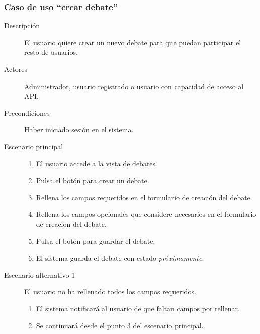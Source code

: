 \subsubsection{Caso de uso ``crear debate''}
\begin{description}
\item[Descripción] El usuario quiere crear un nuevo debate para que puedan participar el resto de usuarios.
\item[Actores] Administrador, usuario registrado o usuario con capacidad de acceso al API.
\item[Precondiciones] Haber iniciado sesión en el sistema.
\item[Escenario principal] \hfill
						 	\begin{enumerate}
							\item El usuario accede a la vista de debates.
							\item Pulsa el botón para crear un debate.
							\item Rellena los campos requeridos en el formulario de creación del debate.
							\item Rellena los campos opcionales que considere necesarios en el formulario de creación del debate.
							\item Pulsa el botón para guardar el debate.
							\item El sistema guarda el debate con estado \textit{próximamente}.
							\end{enumerate}
\item[Escenario alternativo 1] El usuario no ha rellenado todos los campos requeridos.
							\begin{enumerate}
							\item El sistema notificará al usuario de que faltan campos por rellenar.
							\item Se continuará desde el punto 3 del escenario principal.
							\end{enumerate}
\end{description}


